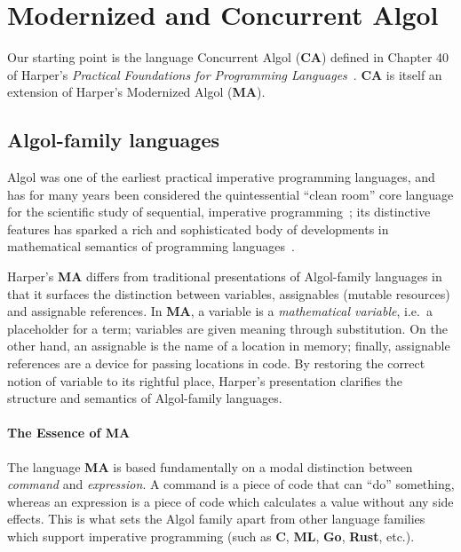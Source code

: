 \documentclass{article}
\newcommand\Lang[1]{{\sffamily\bfseries{#1}}}
\newcommand\LangCA{\Lang{CA}}
\newcommand\LangMA{\Lang{MA}}
\begin{document}
\section{Modernized and Concurrent Algol}

Our starting point is the language Concurrent Algol (\LangCA) defined
in Chapter 40 of Harper's \emph{Practical Foundations for Programming
  Languages}~\cite{harper:2016}. \LangCA{} is itself an extension of
Harper's Modernized Algol (\LangMA).

\subsection{Algol-family languages}

Algol was one of the earliest practical imperative programming
languages, and has for many years been considered the quintessential
``clean room'' core language for the scientific study of sequential,
imperative programming~\cite{reynolds:1997}; its distinctive features
has sparked a rich and sophisticated body of developments in
mathematical semantics of programming
languages~\cite{mccusker-power:2010}.

Harper's \LangMA{} differs from traditional presentations of
Algol-family languages in that it surfaces the distinction between
variables, assignables (mutable resources) and assignable
references. In \LangMA{}, a variable is a \emph{mathematical
  variable}, i.e.\ a placeholder for a term; variables are given
meaning through substitution. On the other hand, an assignable is the
name of a location in memory; finally, assignable references are a
device for passing locations in code. By restoring the correct notion
of variable to its rightful place, Harper's presentation clarifies the
structure and semantics of Algol-family languages.

\paragraph{The Essence of \LangMA{}}

The language \LangMA{} is based fundamentally on a modal distinction
between \emph{command} and \emph{expression}. A command is a piece of
code that can ``do'' something, whereas an expression is a piece of
code which calculates a value without any side effects. This is what
sets the Algol family apart from other language families which support
imperative programming (such as \Lang{C}, \Lang{ML}, \Lang{Go},
\Lang{Rust}, etc.).
\end{document}
